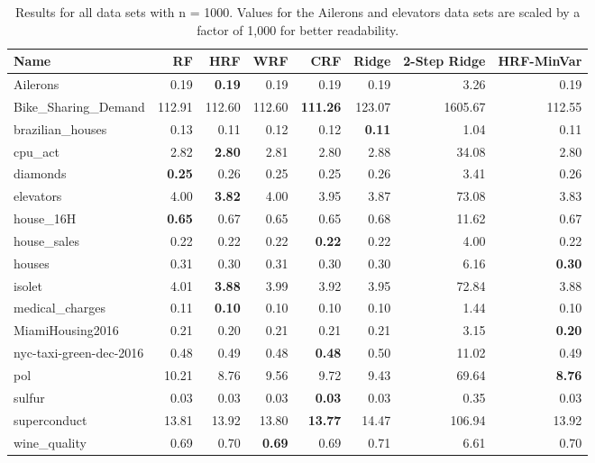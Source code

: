 \begin{table}[ht]
\centering
\begingroup\scriptsize
\begin{tabular}{lrrrrrrr}
  \hline
\textbf{ Name } & \textbf{ RF } & \textbf{ HRF } & \textbf{ WRF } & \textbf{ CRF } & \textbf{ Ridge } & \textbf{ 2-Step Ridge } & \textbf{ HRF-MinVar } \\ 
  \hline
Ailerons & 0.19 & \textbf{0.19} & 0.19 & 0.19 & 0.19 & 3.26 & 0.19 \\ 
  Bike\_Sharing\_Demand & 112.91 & 112.60 & 112.60 & \textbf{111.26} & 123.07 & 1605.67 & 112.55 \\ 
  brazilian\_houses & 0.13 & 0.11 & 0.12 & 0.12 & \textbf{0.11} & 1.04 & 0.11 \\ 
  cpu\_act & 2.82 & \textbf{2.80} & 2.81 & 2.80 & 2.88 & 34.08 & 2.80 \\ 
  diamonds & \textbf{0.25} & 0.26 & 0.25 & 0.25 & 0.26 & 3.41 & 0.26 \\ 
  elevators & 4.00 & \textbf{3.82} & 4.00 & 3.95 & 3.87 & 73.08 & 3.83 \\ 
  house\_16H & \textbf{0.65} & 0.67 & 0.65 & 0.65 & 0.68 & 11.62 & 0.67 \\ 
  house\_sales & 0.22 & 0.22 & 0.22 & \textbf{0.22} & 0.22 & 4.00 & 0.22 \\ 
  houses & 0.31 & 0.30 & 0.31 & 0.30 & 0.30 & 6.16 & \textbf{0.30} \\ 
  isolet & 4.01 & \textbf{3.88} & 3.99 & 3.92 & 3.95 & 72.84 & 3.88 \\ 
  medical\_charges & 0.11 & \textbf{0.10} & 0.10 & 0.10 & 0.10 & 1.44 & 0.10 \\ 
  MiamiHousing2016 & 0.21 & 0.20 & 0.21 & 0.21 & 0.21 & 3.15 & \textbf{0.20} \\ 
  nyc-taxi-green-dec-2016 & 0.48 & 0.49 & 0.48 & \textbf{0.48} & 0.50 & 11.02 & 0.49 \\ 
  pol & 10.21 & 8.76 & 9.56 & 9.72 & 9.43 & 69.64 & \textbf{8.76} \\ 
  sulfur & 0.03 & 0.03 & 0.03 & \textbf{0.03} & 0.03 & 0.35 & 0.03 \\ 
  superconduct & 13.81 & 13.92 & 13.80 & \textbf{13.77} & 14.47 & 106.94 & 13.92 \\ 
  wine\_quality & 0.69 & 0.70 & \textbf{0.69} & 0.69 & 0.71 & 6.61 & 0.70 \\ 
   \hline
\end{tabular}
\endgroup
\caption{Results for all data sets with n = 1000. Values for the Ailerons and elevators data sets are scaled by a factor of 1,000 for better readability.} 
\end{table}
